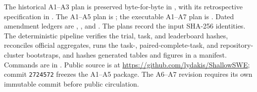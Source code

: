 \documentclass[11pt]{article}
\begin{document}
The historical A1--A3 plan is preserved byte-for-byte in
, with its retrospective specification in
. The A1--A5 plan is
; the executable A1--A7 plan is
. Dated amendment ledgers are
,
, and
. The plans record the input SHA-256 identities. The
deterministic pipeline verifies the trial, task, and leaderboard hashes, reconciles official
aggregates, runs the task-, paired-complete-task, and repository-cluster bootstraps, and hashes generated tables and
figures in a manifest. Commands are in . Public source is at
\url{https://github.com/lydakis/ShallowSWE}; commit \texttt{2724572} freezes the A1--A5 package.
The A6--A7 revision requires its own immutable commit before public circulation.

\endgroup
\end{document}
